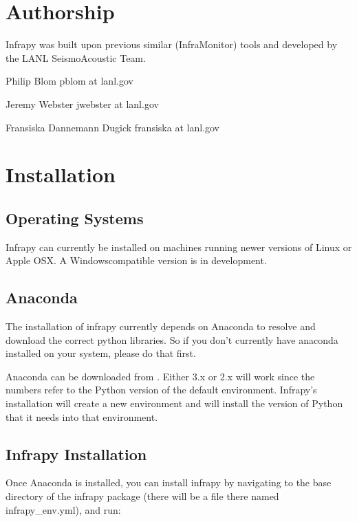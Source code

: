 \documentclass[letterpaper,10pt,english]{sphinxmanual}
\begin{document}
\section{Authorship}
\label{\detokenize{authorship:authorship}}\label{\detokenize{authorship::doc}}
Infrapy was built upon previous similar (InfraMonitor) tools and developed by the LANL SeismoAcoustic Team.

Philip Blom
pblom at lanl.gov

Jeremy Webster
jwebster at lanl.gov

Fransiska Dannemann Dugick
fransiska at lanl.gov


\section{Installation}
\label{\detokenize{installation:installation}}\label{\detokenize{installation:id1}}\label{\detokenize{installation::doc}}

\subsection{Operating Systems}
\label{\detokenize{installation:operating-systems}}
Infrapy can currently be installed on machines running newer versions of Linux or Apple OSX.  A Windows\sphinxhyphen{}compatible version is in development.


\subsection{Anaconda}
\label{\detokenize{installation:anaconda}}
The installation of infrapy currently depends on Anaconda to resolve and download the correct python libraries. So if you don’t currently have anaconda installed
on your system, please do that first.

Anaconda can be downloaded from . Either 3.x or 2.x will work since the numbers refer to the Python version of the default
environment.  Infrapy’s installation will create a new environment and will install the version of Python that it needs into that environment.


\subsection{Infrapy Installation}
\label{\detokenize{installation:infrapy-installation}}
Once Anaconda is installed, you can install infrapy by navigating to the base directory of the infrapy package (there will be a file there
named infrapy\_env.yml), and run:
\end{document}
